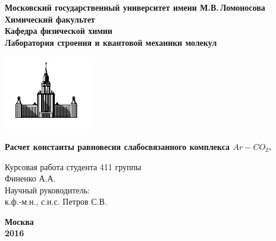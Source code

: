 \begin{titlepage}
\centering
\textbf{\large Московский государственный университет имени М.В.\,Ломоносова\\
\vspace*{0.1cm} Химический факультет\\
\vspace*{0.1cm}
\noindent\makebox[\linewidth]{\rule{\paperwidth}{0.4pt}}
\vspace*{0.1cm}
 Кафедра физической химии\\
\vspace*{0.1cm} Лаборатория строения и квантовой механики молекул \\}
\vspace*{2cm}

\begin{center}
\includegraphics[width=0.3\textwidth]{pictures/logo.jpg}
\end{center}

\vspace*{2cm}
\Large \textbf{Расчет константы равновесия слабосвязанного комплекса $Ar-CO_2$.}
\vspace*{2cm}

\begin{flushright}
\large Курсовая работа студента 411 группы\\
Финенко А.А.\\
\vspace{1cm}
Научный руководитель:\\
к.ф.-м.н., с.н.с. Петров С.В.
\end{flushright}
\vfill
\large\textbf{Москва\\ 2016}
\end{titlepage}

